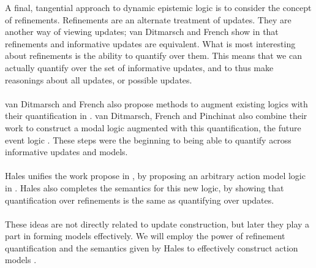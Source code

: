 A final, tangential approach to dynamic epistemic logic is to consider the concept of refinements.
Refinements are an alternate treatment of updates.
They are another way of viewing updates; van Ditmarsch and French show in \cite{van2009simulation}
that refinements and informative updates are equivalent.
What is most interesting about refinements is the ability to quantify over them.
This means that we can actually quantify over the set of informative updates, and to thus make
reasonings about all updates, or possible updates.\\
\\
van Ditmarsch and French also propose methods to augment existing logics with their quantification
in \cite{van2009simulation}.
van Ditmarsch, French and Pinchinat also combine their work to construct a modal logic augmented
with this quantification, the future event logic \cite{van2010future}.
These steps were the beginning to being able to quantify across informative updates and models.\\
\\
Hales unifies the work propose in \cite{van2009simulation}, by proposing an arbitrary action model
logic in \cite{hales13synthesis}.
Hales also completes the semantics for this new logic, by showing that quantification over
refinements is the same as quantifying over updates.\\
\\
These ideas are not directly related to update construction, but later they play a part in forming
models effectively.
We will employ the power of refinement quantification and the semantics given by Hales to
effectively construct action models \cite{hales13synthesis}.
